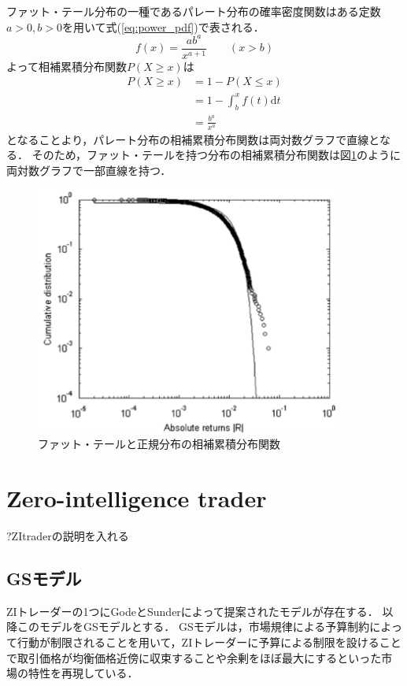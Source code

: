 \documentclass[titlepage]{jsreport}
\begin{document}
ファット・テール分布の一種であるパレート分布の確率密度関数はある定数$a > 0,b > 0$を用いて式(\ref{eq:power_pdf})で表される\cite{PowerDistribution}．
\begin{equation}
    f(x) = \frac{ab^a}{x^{a + 1}} \qquad (x > b) \label{eq:power_pdf}
\end{equation}
よって相補累積分布関数$P(X \geq x)$は
\begin{equation}
    \begin{aligned}
        P(X \geq x) & = 1 - P(X \leq x)                     \\
                    & = 1 - \int_{b}^{x} f(t) \mathrm{d}t   \\
                    & = \frac{b^a}{x^a} \label{eq:survival}
    \end{aligned}
\end{equation}
となることより，パレート分布の相補累積分布関数は両対数グラフで直線となる．
そのため，ファット・テールを持つ分布の相補累積分布関数は図\ref{fig:fat_tail_survival}のように両対数グラフで一部直線を持つ．

\begin{figure}[htbp]
    \centering
    \includegraphics[width=10cm]{fig/fat_tail_survival.pdf}
    \caption{ファット・テールと正規分布の相補累積分布関数\cite{Cont2007}}
    \label{fig:fat_tail_survival}
\end{figure}


\section{Zero-intelligence trader}
?ZItraderの説明を入れる

\subsection{GSモデル}
ZIトレーダーの1つにGodeとSunderによって提案されたモデルが存在する\cite{Gode_and_Sunder}．
以降このモデルをGSモデルとする．
GSモデルは，市場規律による予算制約によって行動が制限されること\cite{market_displine}を用いて，ZIトレーダーに予算による制限を設けることで取引価格が均衡価格近傍に収束することや余剰をほぼ最大にするといった市場の特性を再現している．
\end{document}
